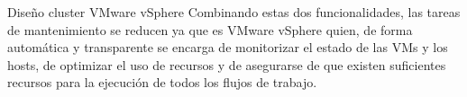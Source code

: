 \begin{subsubsection}{Diseño cluster VMware vSphere}
Combinando estas dos funcionalidades, las tareas de mantenimiento se reducen ya que es VMware vSphere quien, de forma automática y transparente se encarga de monitorizar el estado de las VMs y los hosts, de optimizar el uso de recursos y de asegurarse de que existen suficientes recursos para la ejecución de todos los flujos de trabajo.



\end{subsubsection}
